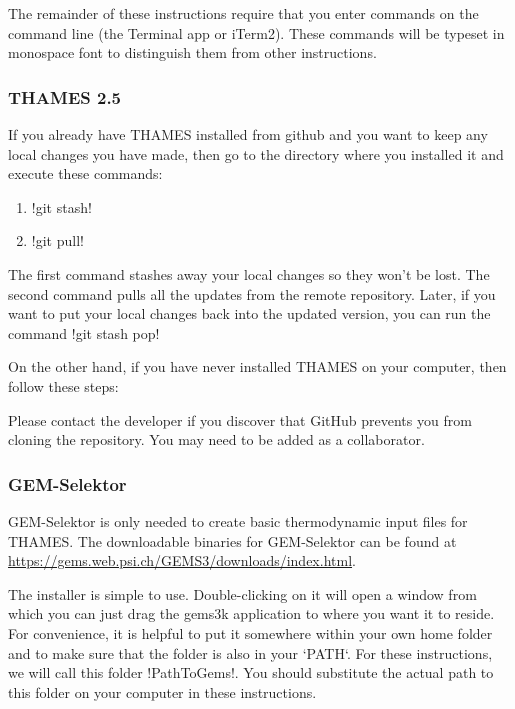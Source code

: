\documentclass{article}
\begin{document}
The remainder of these instructions require that you enter commands on the command line
(the Terminal app or iTerm2).  These commands will be typeset in monospace
font to distinguish them from other instructions.

\subsubsection{THAMES 2.5}
If you already have THAMES installed from github and you want to keep any local changes you
have made, then go to the directory where
you installed it and execute these commands:
\begin{enumerate}
    \item !git stash!
    \item !git pull!
\end{enumerate}
The first command stashes away your local changes so they won't be lost.  The second
command pulls all the updates from the remote repository.  Later, if you want to
put your local changes back into the updated version, you can run the command
!git stash pop!

On the other hand, if you have never installed THAMES on your computer, then
follow these steps:
Please contact the developer if you discover that GitHub prevents you
from cloning the repository. You may need to be added as a collaborator.

\subsubsection{GEM-Selektor}
GEM-Selektor is only needed to create basic thermodynamic input files for
THAMES. The downloadable binaries for GEM-Selektor can be found
at \url{https://gems.web.psi.ch/GEMS3/downloads/index.html}.

The installer is simple to use.  Double-clicking on it will open a window
from which you can just drag the gems3k application to where
you want it to reside.  For convenience, it is helpful to put it somewhere
within your own home folder and to make sure that the folder is also in your `PATH`.
For these instructions, we will call this folder !PathToGems!.
You should substitute the actual path to this folder on your computer in these instructions.
\end{document}
